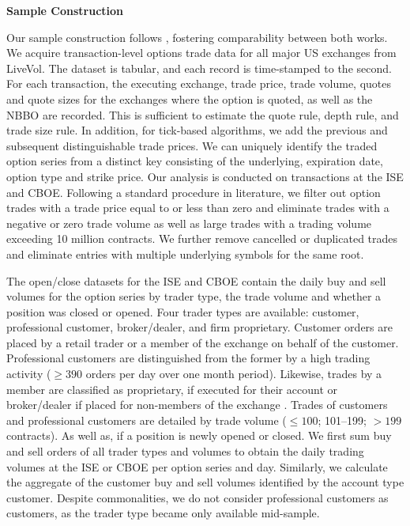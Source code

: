 \textbf{Sample Construction}

Our sample construction follows \textcite[][7--9]{grauerOptionTradeClassification2022}, fostering comparability between both works. We acquire transaction-level options trade data for all major US exchanges from LiveVol. The dataset is tabular, and each record is time-stamped to the second. For each transaction, the executing exchange, trade price, trade volume, quotes and quote sizes for the exchanges where the option is quoted, as well as the \gls{NBBO} are recorded. This is sufficient to estimate the quote rule, depth rule, and trade size rule. In addition, for tick-based algorithms, we add the previous and subsequent distinguishable trade prices. We can uniquely identify the traded option series from a distinct key consisting of the underlying, expiration date, option type and strike price. Our analysis is conducted on transactions at the \gls{ISE} and \gls{CBOE}. Following a standard procedure in literature, we filter out option trades with a trade price equal to or less than zero and eliminate trades with a negative or zero trade volume as well as large trades with a trading volume exceeding 10 million contracts. We further remove cancelled or duplicated trades and eliminate entries with multiple underlying symbols for the same root.

The open/close datasets for the \gls{ISE} and \gls{CBOE} contain the daily buy and sell volumes for the option series by trader type, the trade volume and whether a position was closed or opened. Four trader types are available: customer, professional customer, broker/dealer, and firm proprietary. Customer orders are placed by a retail trader or a member of the exchange on behalf of the customer. Professional customers are distinguished from the former by a high trading activity ($\geq390$ orders per day over one month period). Likewise, trades by a member are classified as proprietary, if executed for their account or broker/dealer if placed for non-members of the exchange \autocite[][2]{nasdaqincFrequentlyAskedQuestions2017}. Trades of customers and professional customers are detailed by trade volume ($\leq 100$; 101--199; $> 199$ contracts). As well as, if a position is newly opened or closed. We first sum buy and sell orders of all trader types and volumes to obtain the daily trading volumes at the \gls{ISE} or \gls{CBOE} per option series and day. Similarly, we calculate the aggregate of the customer buy and sell volumes identified by the account type customer. Despite commonalities, we do not consider professional customers as customers, as the trader type became only available mid-sample.

